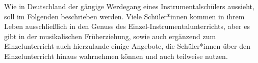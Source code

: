 
Wie in Deutschland der gängige Werdegang eines Instrumentalschülers aussieht,
soll im Folgenden beschrieben werden. Viele Schüler*innen kommen in ihrem Leben
ausschließlich in den Genuss des Einzel-Instrumentalunterrichts, aber es gibt in
der musikalischen Früherziehung, sowie auch ergänzend zum Einzelunterricht auch
hierzulande einige Angebote, die Schüler*innen über den Einzelunterricht hinaus
wahrnehmen können und auch teilweise nutzen.





